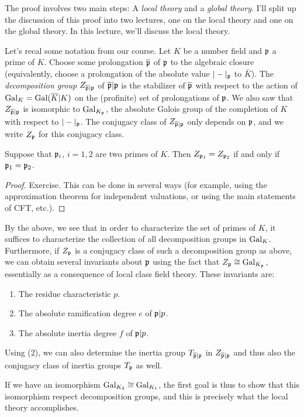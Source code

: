 The proof involves two main steps: A \emph{local theory} and a \emph{global theory}.
I'll split up the discussion of this proof into two lectures, one on the local theory and one on the global theory.
In this lecture, we'll discuss the local theory.

Let's recal some notation from our course.
Let $K$ be a number field and $\mathfrak{p}$ a prime of $K$.
Choose some prolongation $\overline {\mathfrak{p}}$ of $\mathfrak{p}$ to the algebraic closure (equivalently, choose a prolongation of the absolute value $|-|_{\mathfrak{p}}$ to $\bar K$).
The \emph{decomposition group} $Z_{\overline{\mathfrak{p}}|\mathfrak{p}}$ of $\overline{\mathfrak{p}}|\mathfrak{p}$ is the stabilizer of $\overline {\mathfrak{p}}$ with respect to the action of $\operatorname{Gal}_{K} = \operatorname{Gal}(\overline K|K)$ on the (profinite) set of prolongations of $\mathfrak{p}$.
We also saw that $Z_{\overline{\mathfrak{p}}|\mathfrak{p}}$ is isomorphic to $\operatorname{Gal}_{K_{\mathfrak{p}}}$, the absolute Galois group of the completion of $K$ with respect to $|-|_{\mathfrak{p}}$.
The conjugacy class of $Z_{\overline{\mathfrak{p}}|\mathfrak{p}}$ only depends on $\mathfrak{p}$, and we write $Z_{\mathfrak{p}}$ for this conjugacy class.

\begin{lemma}
  Suppose that $\mathfrak{p}_{i}$, $i = 1,2$ are two primes of $K$.
  Then $Z_{\mathfrak{p}_{1}} = Z_{\mathfrak{p}_{2}}$ if and only if $\mathfrak{p}_{1} = \mathfrak{p}_{2}$.
\end{lemma}
\begin{proof}
  Exercise.
  This can be done in several ways (for example, using the approximation theorem for independent valuations, or using the main statements of CFT, etc.).
\end{proof}

By the above, we see that in order to characterize the set of primes of $K$, it suffices to characterize the collection of all decomposition groups in $\operatorname{Gal}_{K}$.
Furthermore, if $Z_{\mathfrak{p}}$ is a conjugacy class of such a decomposition group as above, we can obtain several invariants about $\mathfrak{p}$ using the fact that $Z_{\mathfrak{p}} \cong \operatorname{Gal}_{K_{\mathfrak{p}}}$, essentially as a consequence of local class field theory.
These invariants are:
\begin{enumerate}
  \item The residue characteristic $p$.
  \item The absolute ramification degree $e$ of $\mathfrak{p}|p$.
  \item The absolute inertia degree $f$ of $\mathfrak{p}|p$.
\end{enumerate}
Using (2), we can also determine the inertia group $T_{\overline{\mathfrak{p}}|\mathfrak{p}}$ in $Z_{\overline{\mathfrak{p}}|\mathfrak{p}}$ and thus also the conjugacy class of inertia groups $T_{\mathfrak{p}}$ as well.

If we have an isomorphism $\operatorname{Gal}_{K_{2}} \cong \operatorname{Gal}_{K_{1}}$, the first goal is thus to show that this isomorphism respect decomposition groups, and this is precisely what the local theory accomplishes.


